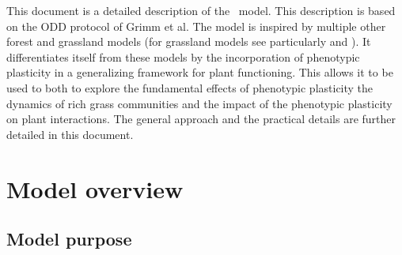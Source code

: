 

\begin{fullwidth}
\noindent
This document is a detailed description of the \model ~model. This description is based on the ODD protocol of Grimm et al. The model is inspired by multiple other forest and grassland models (for grassland models see particularly \citet{taubert_modelling_2014} and \citet{lohier_analyse_2016}). It differentiates itself from these models by the incorporation of phenotypic plasticity in a generalizing framework for plant functioning. This allows it to be used to both to explore the fundamental effects of phenotypic plasticity the dynamics of rich grass communities and the impact of the phenotypic plasticity on plant interactions. The general approach and the practical details are further detailed in this document.
\end{fullwidth}



\section{Model overview}

\subsection{Model purpose}

